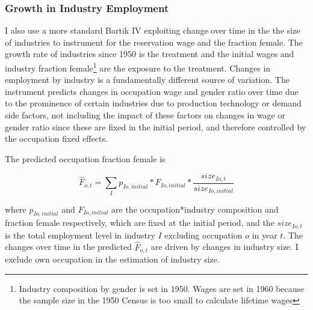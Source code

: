 \documentclass[12pt]{article}
\begin{document}





\subsubsection{Growth in Industry Employment}
I also use a more standard Bartik IV exploiting change over time in the the size of industries to instrument for the reservation wage and the fraction female. The growth rate of industries since 1950 is the treatment and the initial wages and industry fraction female\footnote{Industry composition by gender is set in 1950. Wages are set in 1960 because the sample size in the 1950 Census is too small to calculate lifetime wages} are the exposure to the treatment. Changes in employment by industry is a fundamentally different source of variation. The instrument predicts changes in occupation wage and gender ratio over time due to the prominence of certain industries due to production technology or demand side factors, not including the impact of these factors on changes in wage or gender ratio since these are fixed in the initial period, and therefore controlled by the occupation fixed effects.

The predicted occupation fraction female is

$$\hat{F}_{o,t} = \sum_I p_{Io,initial}*F_{Io,initial}*\frac{size_{Io,t}}{size_{Io,initial}}$$

where $p_{Io,initial}$ and $ F_{Io,initial}$ are the occupation*industry composition and fraction female respectively, which are fixed at the initial period, and the $size_{Io,t}$ is the total employment level in industry $I$ excluding occupation $o$ in year $t$. The changes over time in the predicted $\hat{F}_{o,t}$ are driven by changes in industry size. I exclude own occupation in the estimation of industry size.
\end{document}
